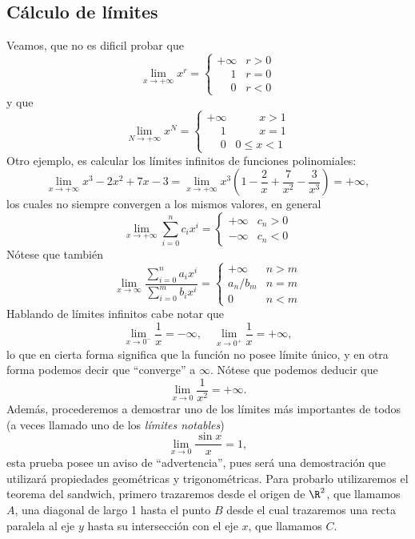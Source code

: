 \documentclass[11pt,oneside,a4paper]{book}
\begin{document}
\subsection*{Cálculo de límites}
Veamos, que no es dificil probar que
$$\lim_{x\to+\infty}x^r=\begin{cases}
+\infty &r\gt 0\\
\phantom{+}1 &r=0\\
\phantom{+}0 &r\lt 0
\end{cases}$$
y que
$$\lim_{N\to+\infty}x^N=\begin{cases}
+\infty &\phantom{0\lt}\;x\gt 1\\
\phantom{+}1 &\phantom{0\lt}\;x=1\\
\phantom{+}0 &0\leq x\lt 1
\end{cases}$$
Otro ejemplo, es calcular los límites infinitos de funciones polinomiales:
$$\lim_{x\to+\infty}x^3-2x^2+7x-3=\lim_{x\to+\infty}x^3\left(1-\frac{2}{x}+\frac{7}{x^2}-\frac{3}{x^3}\right)=+\infty,$$
los cuales no siempre convergen a los mismos valores, en general
$$\lim_{x\to+\infty}\sum_{i=0}^n c_ix^i=\begin{cases}
+\infty &c_n\gt 0\\
-\infty &c_n\lt 0
\end{cases}$$
Nótese que también
\begin{equation}
\lim_{x\to\infty}\frac{\sum_{i=0}^n a_ix^i}{\sum_{i=0}^m b_ix^i}=\begin{cases}
+\infty &n\gt m\\
a_n/b_m &n=m\\
0 &n\lt m
\end{cases}
\end{equation}
Hablando de límites infinitos cabe notar que
\begin{equation}
\lim_{x\to 0^-}\frac{1}{x}=-\infty,\quad\lim_{x\to0^+}\frac{1}{x}=+\infty,
\end{equation}
lo que en cierta forma significa que la función no posee límite único, y en otra forma podemos decir que ``converge'' a $\infty$. Nótese que podemos deducir que
\begin{equation}
\lim_{x\to 0}\frac{1}{x^2}=+\infty.
\end{equation}
Además, procederemos a demostrar uno de los límites más importantes de todos (a veces llamado uno de los \textit{límites notables})
\begin{equation}
\lim_{x\to 0}\frac{\sin x}{x}=1,
\end{equation}
esta prueba posee un aviso de ``advertencia'', pues será una demostración que utilizará propiedades geométricas y trigonométricas. Para probarlo utilizaremos el teorema del sandwich, primero trazaremos desde el origen de $\R^2$, que llamamos $A$, una diagonal de largo 1 hasta el punto $B$ desde el cual trazaremos una recta paralela al eje $y$ hasta su intersección con el eje $x$, que llamamos $C$.
\end{document}
